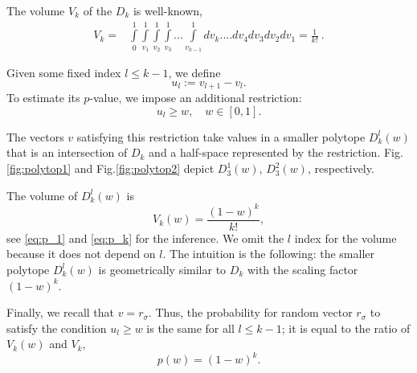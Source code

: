 The volume $V_k$ of the $D_k$ is well-known,
\begin{eqnarray*}
V_k = &\displaystyle \int\limits_0^1\int\limits_{v_1}^1\int\limits_{v_2}^1\int\limits_{v_3}^1...\int\limits_{v_{k-1}}^1 dv_k....dv_4 dv_3 dv_2 dv_1 =  \frac{1}{k!}~.
\end{eqnarray*}

Given some fixed index $l\leq k-1$, we define
\[
u_{l} := v_{l+1} - v_{l}. 
\]
To estimate its $p$-value, we impose an additional restriction:
\[
u_{l} \ge w, \quad w \in [0, 1].
\]

The vectors $v$ satisfying this restriction take values in a smaller polytope $D^{l}_{k}(w)$ that is an intersection of $D_{k}$ and a half-space represented by the restriction.
Fig.\ref{fig:polytop1} and Fig.\ref{fig:polytop2} depict $D^{1}_{3}(w)$, $D^{2}_{3}(w)$, respectively. 

The volume of $D^{l}_{k}(w)$ is 
\begin{equation}
V_{k}(w) = \frac{(1-w)^k}{k!},
\end{equation}
see \eqref{eq:p_1} and \eqref{eq:p_k} for the inference. We omit the $l$ index for the volume because it does not depend on $l$. The intuition is the following: the smaller polytope $D^{l}_{k}(w)$ is geometrically similar to $D_{k}$ with the scaling factor $(1-w)^k$. 

Finally, we recall that $v = r_{\sigma}$. Thus, the probability for random vector $r_{\sigma}$ to satisfy the condition $u_{l} \ge w$ is the same for all $l\leq k-1$; it is equal to the ratio of $V_{k}(w)$ and $V_k$,
\begin{equation}
\label{eq:pw}
    p(w) = (1-w)^k.
\end{equation}

